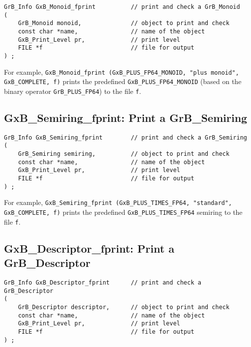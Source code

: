 \documentclass[12pt]{article}
\begin{document}
\begin{mdframed}[userdefinedwidth=6in]
{\footnotesize
\begin{verbatim}
GrB_Info GxB_Monoid_fprint          // print and check a GrB_Monoid
(
    GrB_Monoid monoid,              // object to print and check
    const char *name,               // name of the object
    GxB_Print_Level pr,             // print level
    FILE *f                         // file for output
) ;
\end{verbatim} } \end{mdframed}

For example,
\verb'GxB_Monoid_fprint (GxB_PLUS_FP64_MONOID, "plus monoid",'
\verb'GxB_COMPLETE, f)'
prints the predefined \verb'GxB_PLUS_FP64_MONOID' (based on the binary
operator \verb'GrB_PLUS_FP64') to the file \verb'f'.

\subsection{{\sf GxB\_Semiring\_fprint:} Print a {\sf GrB\_Semiring}}

\begin{mdframed}[userdefinedwidth=6in]
{\footnotesize
\begin{verbatim}
GrB_Info GxB_Semiring_fprint        // print and check a GrB_Semiring
(
    GrB_Semiring semiring,          // object to print and check
    const char *name,               // name of the object
    GxB_Print_Level pr,             // print level
    FILE *f                         // file for output
) ;
\end{verbatim} } \end{mdframed}

For example,
\verb'GxB_Semiring_fprint (GxB_PLUS_TIMES_FP64, "standard",'
\verb'GxB_COMPLETE, f)'
prints the predefined \verb'GxB_PLUS_TIMES_FP64' semiring to the file \verb'f'.

\subsection{{\sf GxB\_Descriptor\_fprint:} Print a {\sf GrB\_Descriptor}}

\begin{mdframed}[userdefinedwidth=6in]
{\footnotesize
\begin{verbatim}
GrB_Info GxB_Descriptor_fprint      // print and check a GrB_Descriptor
(
    GrB_Descriptor descriptor,      // object to print and check
    const char *name,               // name of the object
    GxB_Print_Level pr,             // print level
    FILE *f                         // file for output
) ;
\end{verbatim} } \end{mdframed}
\end{document}

